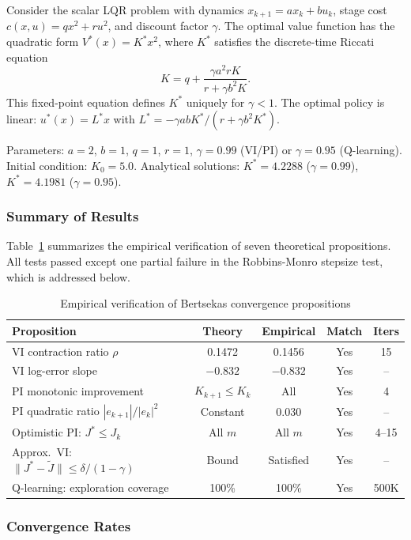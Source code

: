 Consider the scalar LQR problem with dynamics $x_{k+1} = ax_k + bu_k$, stage cost $c(x,u) = qx^2 + ru^2$, and discount factor $\gamma$. The optimal value function has the quadratic form $V^*(x) = K^* x^2$, where $K^*$ satisfies the discrete-time Riccati equation
\[
K = q + \frac{\gamma a^2 r K}{r + \gamma b^2 K}.
\]
This fixed-point equation defines $K^*$ uniquely for $\gamma < 1$. The optimal policy is linear: $u^*(x) = L^* x$ with $L^* = -\gamma abK^* / (r + \gamma b^2 K^*)$.

Parameters: $a = 2$, $b = 1$, $q = 1$, $r = 1$, $\gamma = 0.99$ (VI/PI) or $\gamma = 0.95$ (Q-learning). Initial condition: $K_0 = 5.0$. Analytical solutions: $K^* = 4.2288$ ($\gamma = 0.99$), $K^* = 4.1981$ ($\gamma = 0.95$).

\subsubsection{Summary of Results}

Table~\ref{tab:theory_verification} summarizes the empirical verification of seven theoretical propositions. All tests passed except one partial failure in the Robbins-Monro stepsize test, which is addressed below.

\begin{table}[h!]
\centering
\caption{Empirical verification of Bertsekas convergence propositions}
\label{tab:theory_verification}
\begin{tabular}{p{4.8cm}|c|c|c|c}
\hline
Proposition & Theory & Empirical & Match & Iters \\
\hline
VI contraction ratio $\rho$ & 0.1472 & 0.1456 & Yes & 15 \\
VI log-error slope & $-0.832$ & $-0.832$ & Yes & -- \\
PI monotonic improvement & $K_{k+1} \leq K_k$ & All & Yes & 4 \\
PI quadratic ratio $|e_{k+1}|/|e_k|^2$ & Constant & 0.030 & Yes & -- \\
Optimistic PI: $J^* \leq J_k$ & All $m$ & All $m$ & Yes & 4--15 \\
Approx.~VI: $\|J^* - \tilde{J}\| \leq \delta/(1-\gamma)$ & Bound & Satisfied & Yes & -- \\
Q-learning: exploration coverage & 100\% & 100\% & Yes & 500K \\
\hline
\end{tabular}
\end{table}

\subsubsection{Convergence Rates}


